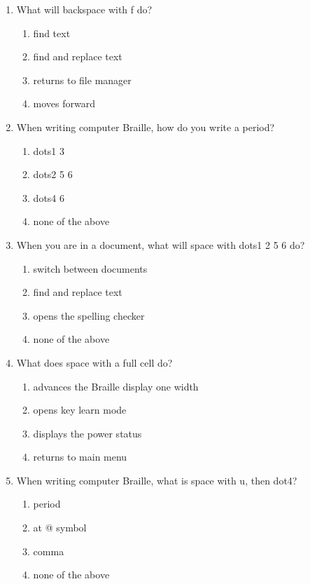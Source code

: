 \documentclass[10pt,letterpaper,twoside]{report}
\begin{document}
{{{\begin{enumerate}
\begin{enumerate}
		      \item backspace with d
		      \item enter with low d
	      \end{enumerate}
	\item What will backspace with f do?
	      \begin{enumerate}
		      \item find text
		      \item find and replace text
		      \item returns to file manager
		      \item moves forward
	      \end{enumerate}
	\item When writing computer Braille, how do you write a period?
	      \begin{enumerate}
		      \item dots1 3
		      \item dots2 5 6
		      \item dots4 6
		      \item none of the above
	      \end{enumerate}
	\item When you are in a document, what will space with dots1 2 5 6 do?
	      \begin{enumerate}
		      \item switch between documents
		      \item find and replace text
		      \item opens the spelling checker
		      \item none of the above
	      \end{enumerate}
	\item What does space with a full cell do?
	      \begin{enumerate}
		      \item advances the Braille display one width
		      \item opens key learn mode
		      \item displays the power status
		      \item returns to main menu
	      \end{enumerate}
	\item When writing computer Braille, what is space with u, then dot4?
	      \begin{enumerate}
		      \item period
		      \item at @ symbol
		      \item comma
		      \item none of the above
	      \end{enumerate}
\end{enumerate}

}}}
\end{document}
